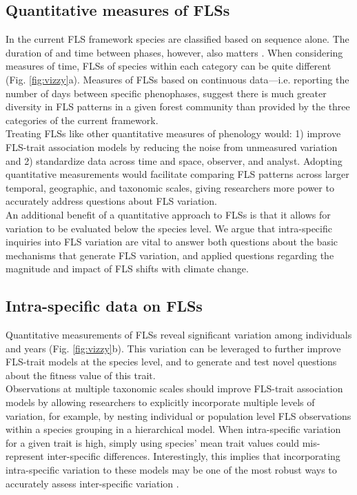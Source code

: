 \documentclass[11pt]{article}
\begin{document}
\subsection*{Quantitative measures of FLSs}
\noindent In the current FLS framework species are classified based on sequence alone. The duration of and time between phases, however, also matters \citep{Inouye2019}. When considering measures of time, FLSs of species within each category can be quite different (Fig. \ref{fig:vizzy}a). Measures of FLSs based on continuous data---i.e. reporting the number of days between specific phenophases, suggest there is much greater diversity in FLS patterns in a given forest community than provided by the three categories of the current framework.\\ 

\noindent Treating FLSs like other quantitative measures of phenology \citep[e.g. the BBCH scale,][]{Finn2007} would: 1) improve FLS-trait association models by reducing the noise from unmeasured variation and 2) standardize data across time and space, observer, and analyst. Adopting quantitative measurements would facilitate comparing FLS patterns across larger temporal, geographic, and taxonomic scales, giving researchers more power to accurately address questions about FLS variation.\\

\noindent An additional benefit of a quantitative approach to FLSs is that it allows for variation to be evaluated below the species level. We argue that intra-specific inquiries into FLS variation are vital to answer both questions about the basic mechanisms that generate FLS variation, and applied questions regarding the magnitude and impact of FLS shifts with climate change.

\subsection*{Intra-specific data on FLSs}

\noindent Quantitative measurements of FLSs reveal significant variation among individuals and years (Fig. \ref{fig:vizzy}b). This variation can be leveraged to further improve FLS-trait models at the species level, and to generate and test novel questions about the fitness value of this trait.\\

\noindent Observations at multiple taxonomic scales should improve FLS-trait association models by allowing researchers to explicitly incorporate multiple levels of variation, for example, by nesting individual or population level FLS observations within a species grouping in a hierarchical model. When intra-specific variation for a given trait is high, simply using species' mean trait values could mis-represent inter-specific differences. Interestingly, this implies that incorporating intra-specific variation to these models may be one of the most robust ways to accurately assess inter-specific variation \citep{Smith2019}.\\  
\end{document}
